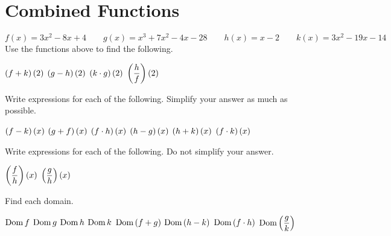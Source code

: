 \section*{Combined Functions}
\[
f(x)=3x^2-8x+4
\qquad
g(x)=x^3+7x^2-4x-28
\qquad
h(x)=x-2
\qquad
k(x)=3x^2-19x-14
\]
Use the functions above to find the following.
\begin{smenum}
\mitemxxxx
{$\left(f+k\right)(2)$}
{$\left(g-h\right)(2)$}
{$\left(k\cdot g\right)(2)$}
{$\left(\dfrac{h}{f}\right)(2)$}
\end{smenum}
Write expressions for each of the following. Simplify your answer as much as possible.
\begin{smenum}
\mitemxxx
{$\left(f-k\right)(x)$}
{$\left(g+f\right)(x)$}
{$\left(f\cdot h\right)(x)$}
\mitemxxx
{$\left(h-g\right)(x)$}
{$\left(h+k\right)(x)$}
{$\left(f\cdot k\right)(x)$}
\end{smenum}
Write expressions for each of the following. Do not simplify your answer.
\begin{smenum}
\mitemxx
{$\left(\dfrac{f}{h}\right)(x)$}
{$\left(\dfrac{g}{h}\right)(x)$}
\end{smenum}
Find each domain.
\begin{smenum}
\mitemxxxx
{$\operatorname{Dom} f$}
{$\operatorname{Dom} g$}
{$\operatorname{Dom} h$}
{$\operatorname{Dom} k$}
\mitemxxxx
{$\operatorname{Dom}\left(f+g\right)$}
{$\operatorname{Dom}\left(h-k\right)$}
{$\operatorname{Dom}\left(f\cdot h\right)$}
{$\operatorname{Dom}\left(\dfrac{g}{k}\right)$}
\end{smenum}


